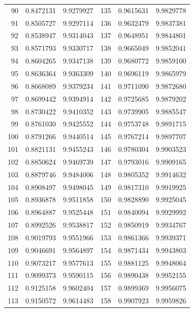 \begin{center}
\begingroup\fontsize{9}{10.2}\selectfont\setlength{\tabcolsep}{4pt}\renewcommand{\arraystretch}{1.0}
\begin{tabular}{||r|r|r||r|r|r||}\hline\hline
90 & 0.8472131 & 9.9279927 & 135 & 0.9615631 & 9.9829778 \\
91 & 0.8505727 & 9.9297114 & 136 & 0.9632479 & 9.9837381 \\
92 & 0.8538947 & 9.9314043 & 137 & 0.9648951 & 9.9844801 \\
93 & 0.8571793 & 9.9330717 & 138 & 0.9665049 & 9.9852041 \\
94 & 0.8604265 & 9.9347138 & 139 & 0.9680772 & 9.9859100 \\
95 & 0.8636364 & 9.9363309 & 140 & 0.9696119 & 9.9865979 \\[3pt]
96 & 0.8668089 & 9.9379234 & 141 & 0.9711090 & 9.9872680 \\
97 & 0.8699442 & 9.9394914 & 142 & 0.9725685 & 9.9879202 \\
98 & 0.8730422 & 9.9410352 & 143 & 0.9739905 & 9.9885547 \\
99 & 0.8761030 & 9.9425552 & 144 & 0.9753748 & 9.9891715 \\
100 & 0.8791266 & 9.9440514 & 145 & 0.9767214 & 9.9897707 \\[3pt]
101 & 0.8821131 & 9.9455243 & 146 & 0.9780304 & 9.9903523 \\
102 & 0.8850624 & 9.9469739 & 147 & 0.9793016 & 9.9909165 \\
103 & 0.8879746 & 9.9484006 & 148 & 0.9805352 & 9.9914632 \\
104 & 0.8908497 & 9.9498045 & 149 & 0.9817310 & 9.9919925 \\
105 & 0.8936878 & 9.9511858 & 150 & 0.9828890 & 9.9925045 \\[3pt]
106 & 0.8964887 & 9.9525448 & 151 & 0.9840094 & 9.9929992 \\
107 & 0.8992526 & 9.9538817 & 152 & 0.9850919 & 9.9934767 \\
108 & 0.9019793 & 9.9551966 & 153 & 0.9861366 & 9.9939371 \\
109 & 0.9046691 & 9.9564897 & 154 & 0.9871434 & 9.9943803 \\
110 & 0.9073217 & 9.9577613 & 155 & 0.9881125 & 9.9948064 \\[3pt]
111 & 0.9099373 & 9.9590115 & 156 & 0.9890438 & 9.9952155 \\
112 & 0.9125158 & 9.9602404 & 157 & 0.9899369 & 9.9956075 \\
113 & 0.9150572 & 9.9614483 & 158 & 0.9907923 & 9.9959826 \\

\end{tabular}
\end{center}
